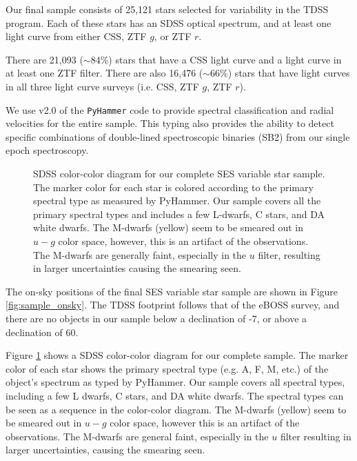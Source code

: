 \documentclass[twocolumn, tighten, astrosymb]{aastex631}
\begin{document}
Our final sample consists of 25,121 stars selected for variability in the TDSS program. Each of these stars has an SDSS optical spectrum, and at least one light curve from either CSS, ZTF $g$, or ZTF $r$.

There are 21,093 ($\sim$84\%) stars that have a CSS light curve and a light curve in at least one ZTF filter. There are also 16,476 ($\sim$66\%) stars that have light curves in all three light curve surveys (i.e. CSS, ZTF $g$, ZTF $r$).

We use v2.0 of the \texttt{PyHammer} code \citep{Roulston2020} to provide spectral classification and radial velocities for the entire sample. This typing also provides the ability to detect specific combinations of double-lined spectroscopic binaries (SB2) from our single epoch spectroscopy. 

\begin{figure}
\centering
{}
\caption{SDSS color-color diagram for our complete SES variable star sample. The marker color for each star is colored according to the primary spectral type as measured by PyHammer. Our sample covers all the primary spectral types and includes a few L-dwarfs, C stars, and DA white dwarfs. The M-dwarfs (yellow) seem to be smeared out in $u-g$ color space, however, this is an artifact of the observations. The M-dwarfs are generally faint, especially in the $u$ filter, resulting in larger uncertainties causing the smearing seen.}
\label{fig:gmr_umg}
\end{figure}

The on-sky positions of the final SES variable star sample are shown in Figure \ref{fig:sample_onsky}. The TDSS footprint follows that of the eBOSS survey, and there are no objects in our sample below a declination of -7\degr, or above a declination of 60\degr.

Figure \ref{fig:gmr_umg} shows a SDSS color-color diagram for our complete sample. The marker color of each star shows the primary spectral type (e.g. A, F, M, etc.) of the object's spectrum as typed by PyHammer. Our sample covers all spectral types, including a few L dwarfs, C stars, and DA white dwarfs. The spectral types can be seen as a sequence in the color-color diagram. The M-dwarfs (yellow) seem to be smeared out in $u-g$ color space, however this is an artifact of the observations. The M-dwarfs are general faint, especially in the $u$ filter resulting in larger uncertainties, causing the smearing seen. 
\end{document}
